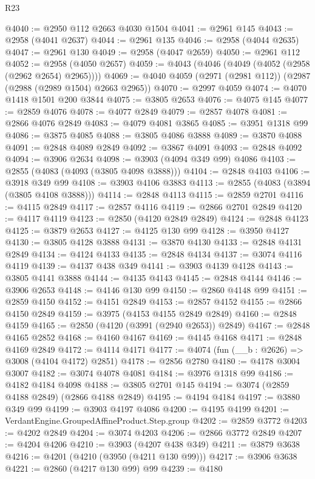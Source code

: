 \begin{lexlean}{R23}
\begin{coremodule}
@4040 := @2950 @112 @2663 @4030 @1504
@4041 := @2961 @145
@4043 := @2958 (@4041 @2637)
@4044 := @2961 @135
@4046 := @2958 (@4044 @2635)
@4047 := @2961 @130
@4049 := @2958 (@4047 @2659)
@4050 := @2961 @112
@4052 := @2958 (@4050 @2657)
@4059 := @4043 (@4046 (@4049 (@4052 (@2958 (@2962 @2654) @2965))))
@4069 := @4040 @4059 (@2971 (@2981 @112)) (@2987 (@2988 (@2989 @1504) @2663 @2965))
@4070 := @2997 @4059
@4074 := @4070 @1418 @1501 @200 @3844
@4075 := @3805 @2653
@4076 := @4075 @145
@4077 := @2859 @4076
@4078 := @4077 @2849
@4079 := @2857 @4078
@4081 := @2866 @4076 @2849
@4083 := @4079 @4081 @3865
@4085 := @3951 @1318 @99
@4086 := @3875 @4085
@4088 := @3805 @4086 @3888
@4089 := @3870 @4088
@4091 := @2848 @4089 @2849
@4092 := @3867 @4091
@4093 := @2848 @4092
@4094 := @3906 @2634
@4098 := @3903 (@4094 @349 @99) @4086
@4103 := @2855 (@4083 (@4093 (@3805 @4098 @3888)))
@4104 := @2848 @4103
@4106 := @3918 @349 @99
@4108 := @3903 @4106 @3883
@4113 := @2855 (@4083 (@3894 (@3805 @4108 @3888)))
@4114 := @2848 @4113
@4115 := @2859 @2701
@4116 := @4115 @2849
@4117 := @2857 @4116
@4119 := @2866 @2701 @2849
@4120 := @4117 @4119
@4123 := @2850 (@4120 @2849 @2849)
@4124 := @2848 @4123
@4125 := @3879 @2653
@4127 := @4125 @130 @99
@4128 := @3950 @4127
@4130 := @3805 @4128 @3888
@4131 := @3870 @4130
@4133 := @2848 @4131 @2849
@4134 := @4124 @4133
@4135 := @2848 @4134
@4137 := @3074 @4116 @4119
@4139 := @4137 @438 @349
@4141 := @3903 @4139 @4128
@4143 := @3805 @4141 @3888
@4144 := @4135 @4143
@4145 := @2848 @4144
@4146 := @3906 @2653
@4148 := @4146 @130 @99
@4150 := @2860 @4148 @99
@4151 := @2859 @4150
@4152 := @4151 @2849
@4153 := @2857 @4152
@4155 := @2866 @4150 @2849
@4159 := @3975 (@4153 @4155 @2849 @2849)
@4160 := @2848 @4159
@4165 := @2850 (@4120 (@3991 (@2940 @2653)) @2849)
@4167 := @2848 @4165 @2852
@4168 := @4160 @4167
@4169 := @4145 @4168
@4171 := @2848 @4169 @2849
@4172 := @4114 @4171
@4177 := @4074 (fun (__b : @2626) => @3008 (@4104 @4172) @2851)
@4178 := @2856 @2780
@4180 := @4178 @3004 @3007
@4182 := @3074 @4078 @4081
@4184 := @3976 @1318 @99
@4186 := @4182 @4184 @4098
@4188 := @3805 @2701 @145
@4194 := @3074 (@2859 @4188 @2849) (@2866 @4188 @2849)
@4195 := @4194 @4184
@4197 := @3880 @349 @99
@4199 := @3903 @4197 @4086
@4200 := @4195 @4199
@4201 := VerdantEngine.GroupedAffineProduct.Step.group
@4202 := @2859 @3772
@4203 := @4202 @2849
@4204 := @3074 @4203
@4206 := @2866 @3772 @2849
@4207 := @4204 @4206
@4210 := @3903 (@4207 @438 @349)
@4211 := @3879 @3638
@4216 := @4201 (@4210 (@3950 (@4211 @130 @99)))
@4217 := @3906 @3638
@4221 := @2860 (@4217 @130 @99) @99
@4239 := @4180

\end{coremodule}
\end{lexlean}
